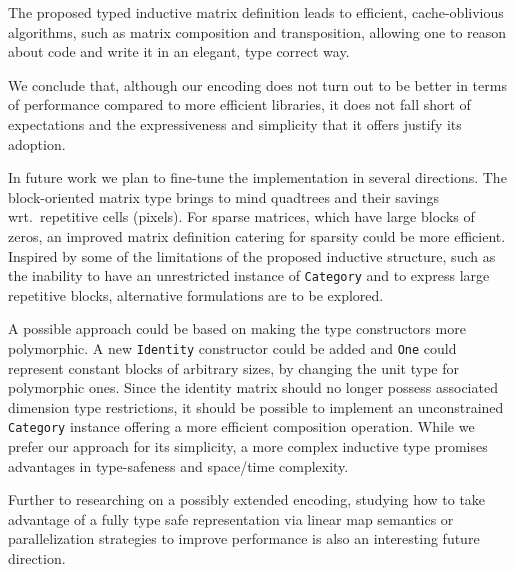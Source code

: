 \documentclass[sigplan]{acmart}\settopmatter{}
\newcommand{\hs}{\texttt}
\begin{document}
The proposed typed inductive matrix definition leads to efficient, cache-oblivious algorithms, such as matrix composition and transposition, allowing one to reason about code and write it in an elegant, type correct way.

We conclude that, although our encoding does not turn out to be better in terms of performance compared to more efficient libraries, it does not fall short of expectations and the expressiveness and simplicity that it offers justify its adoption.

In future work we plan to fine-tune the implementation in several directions.
The block-oriented matrix type brings to mind quadtrees \cite{samet1984quadtree} and their savings wrt.\ repetitive cells (pixels). For sparse matrices, which have large blocks of zeros, an improved matrix definition catering for sparsity could be more efficient. Inspired by some of the limitations of the proposed inductive structure, such as the inability to have an unrestricted instance of \hs{Category} and to express large repetitive blocks, alternative formulations are to be explored. 

A possible approach could be based on making the type constructors more polymorphic.
A new \hs{Identity} constructor could be added and \hs{One} could represent constant blocks of arbitrary sizes, by changing the unit type for polymorphic ones. Since the identity matrix should no longer possess associated dimension type restrictions, it should be possible to implement an unconstrained \hs{Category} instance offering a more efficient composition operation.
While we prefer our approach for its simplicity, a more complex inductive type promises advantages in type-safeness and space/time complexity.

Further to researching on a possibly extended encoding, studying how to take advantage of a fully type safe representation via linear map semantics or parallelization strategies to improve performance is also an interesting future direction.
\end{document}
